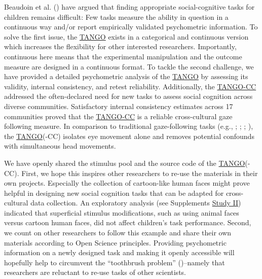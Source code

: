 \documentclass[
]{scrbook}
\begin{document}
Beaudoin et al. () have argued that finding appropriate social-cognitive tasks for children remains difficult: Few tasks measure the ability in question in a continuous way and/or report empirically validated psychometric information. To solve the first issue, the \hyperref[acronyms_TANGO]{TANGO} exists in a categorical and continuous version which increases the flexibility for other interested researchers. Importantly, continuous here means that the experimental manipulation and the outcome measure are designed in a continuous format. To tackle the second challenge, we have provided a detailed psychometric analysis of the \hyperref[acronyms_TANGO]{TANGO} by assessing its validity, internal consistency, and retest reliability. Additionally, the \hyperref[acronyms_TANGO-CC]{TANGO-CC} addressed the often-declared need for new tasks to assess social cognition across diverse communities. Satisfactory internal consistency estimates across 17 communities proved that the \hyperref[acronyms_TANGO-CC]{TANGO-CC} is a reliable cross-cultural gaze following measure. In comparison to traditional gaze-following tasks (e.g., ; ; ; ), the \hyperref[acronyms_TANGO]{TANGO}(-CC) isolates eye movement alone and removes potential confounds with simultaneous head movements.

We have openly shared the stimulus pool and the source code of the \hyperref[acronyms_TANGO]{TANGO}(-CC). First, we hope this inspires other researchers to re-use the materials in their own projects. Especially the collection of cartoon-like human faces might prove helpful in designing new social cognition tasks that can be adapted for cross-cultural data collection. An exploratory analysis (see Supplements \hyperref[studyII]{Study II}) indicated that superficial stimulus modifications, such as using animal faces versus cartoon human faces, did not affect children's task performance. Second, we count on other researchers to follow this example and share their own materials according to Open Science principles. Providing psychometric information on a newly designed task and making it openly accessible will hopefully help to circumvent the ``toothbrush problem'' ()\thinspace --\thinspace namely that researchers are reluctant to re-use tasks of other scientists.
\end{document}
